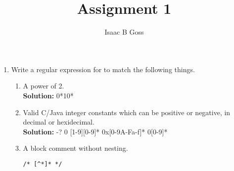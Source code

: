 \documentclass{article}
\author{Isaac B Goss}
\title{Assignment 1}
\date{}
\providecommand{\soln}{\textbf{Solution: }}
\begin{document}
\maketitle

\begin{enumerate}
    \item Write a regular expression for to match the following things.
    \begin{enumerate}
        \item A power of 2.\\ \soln 0*10*%
        \item Valid C/Java integer constants which can be positive or negative, in decimal or hexidecimal.\\
        \soln -? 0 \textbar{} [1-9][0-9]* \textbar{} 0x[0-9A-Fa-f]* \textbar{} 0[0-9]*
        \item A block comment without nesting.
        \begin{verbatim}/* [^*]* */\end{verbatim}
    \end{enumerate}
\end{enumerate}
\end{document}
